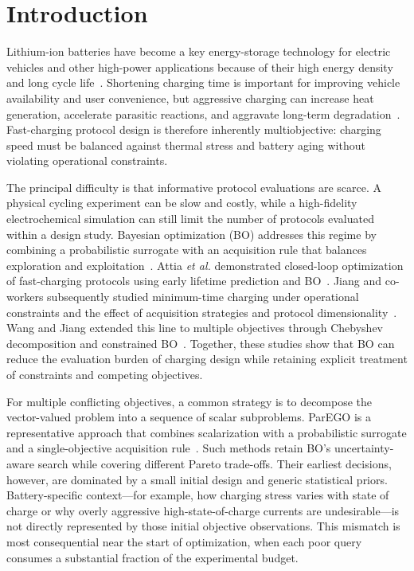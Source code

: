 \section{Introduction}
\label{sec:introduction}

Lithium-ion batteries have become a key energy-storage technology for electric
vehicles and other high-power applications because of their high energy density
and long cycle life~\cite{ref1}. Shortening charging time is important for
improving vehicle availability and user convenience, but aggressive charging
can increase heat generation, accelerate parasitic reactions, and aggravate
long-term degradation~\cite{ref2}. Fast-charging protocol design is therefore
inherently multiobjective: charging speed must be balanced against thermal
stress and battery aging without violating operational constraints.

The principal difficulty is that informative protocol evaluations are scarce.
A physical cycling experiment can be slow and costly, while a high-fidelity
electrochemical simulation can still limit the number of protocols evaluated
within a design study. Bayesian optimization (BO) addresses this regime by
combining a probabilistic surrogate with an acquisition rule that balances
exploration and exploitation~\cite{ref3}. Attia \textit{et al.} demonstrated
closed-loop optimization of fast-charging protocols using early lifetime
prediction and BO~\cite{ref11}. Jiang and co-workers subsequently studied
minimum-time charging under operational constraints and the effect of
acquisition strategies and protocol dimensionality~\cite{ref12,ref14}. Wang and
Jiang extended this line to multiple objectives through Chebyshev decomposition
and constrained BO~\cite{ref13}. Together, these studies show that BO can reduce
the evaluation burden of charging design while retaining explicit treatment of
constraints and competing objectives.

For multiple conflicting objectives, a common strategy is to decompose the
vector-valued problem into a sequence of scalar subproblems. ParEGO is a
representative approach that combines scalarization with a probabilistic
surrogate and a single-objective acquisition rule~\cite{ref4}. Such methods
retain BO's uncertainty-aware search while covering different Pareto
trade-offs. Their earliest decisions, however, are dominated by a small initial
design and generic statistical priors. Battery-specific context---for example,
how charging stress varies with state of charge or why overly aggressive
high-state-of-charge currents are undesirable---is not directly represented by
those initial objective observations. This mismatch is most consequential near
the start of optimization, when each poor query consumes a substantial fraction
of the experimental budget.

